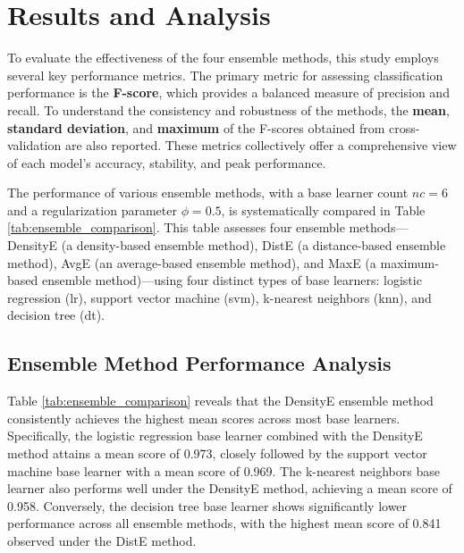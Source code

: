 \documentclass[lettersize,journal]{IEEEtran}
\begin{document}
	\section{Results and Analysis}
	
	\noindent To evaluate the effectiveness of the four ensemble methods, this study employs several key performance metrics. The primary metric for assessing classification performance is the \textbf{F-score}, which provides a balanced measure of precision and recall. To understand the consistency and robustness of the methods, the \textbf{mean}, \textbf{standard deviation}, and \textbf{maximum} of the F-scores obtained from cross-validation are also reported. These metrics collectively offer a comprehensive view of each model's accuracy, stability, and peak performance.
	
	\noindent The performance of various ensemble methods, with a base learner count $nc = 6$ and a regularization parameter $\phi = 0.5$, is systematically compared in Table \ref{tab:ensemble_comparison}. This table assesses four ensemble methods—DensityE (a density-based ensemble method), DistE (a distance-based ensemble method), AvgE (an average-based ensemble method), and MaxE (a maximum-based ensemble method)—using four distinct types of base learners: logistic regression (lr), support vector machine (svm), k-nearest neighbors (knn), and decision tree (dt).
	
	\subsection{Ensemble Method Performance Analysis}
	
	\noindent Table \ref{tab:ensemble_comparison} reveals that the DensityE ensemble method consistently achieves the highest mean scores across most base learners. Specifically, the logistic regression base learner combined with the DensityE method attains a mean score of 0.973, closely followed by the support vector machine base learner with a mean score of 0.969. The k-nearest neighbors base learner also performs well under the DensityE method, achieving a mean score of 0.958.
	Conversely, the decision tree base learner shows significantly lower performance across all ensemble methods, with the highest mean score of 0.841
	observed under the DistE method.
	
	\setlength{\tabcolsep}{2pt} %
	
\end{document}
